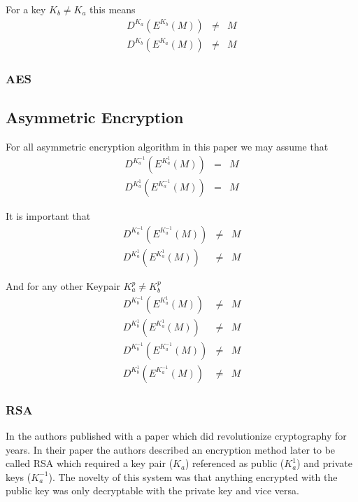 For a key $K_b\neq K_a$ this means
\begin{eqnarray}
	D^{K_a}\left(E^{K_b}\left(M\right)\right) & \neq & M\\
	D^{K_b}\left(E^{K_a}\left(M\right)\right) & \neq & M
\end{eqnarray} 

\subsubsection{AES}

\subsection{Asymmetric Encryption}
For all asymmetric encryption algorithm in this paper we may assume that 
\begin{eqnarray}
	D^{K^{-1}_a}\left(E^{K^{1}_a}\left(M\right)\right) & = & M\\
	D^{K^{1}_a}\left(E^{K^{-1}_a}\left(M\right)\right) & = & M
\end{eqnarray} 

It is important that 
\begin{eqnarray}
	D^{K^{-1}_a}\left(E^{K^{-1}_a}\left(M\right)\right) & \neq & M\\
	D^{K^{1}_a}\left(E^{K^{1}_a}\left(M\right)\right) & \neq & M
\end{eqnarray} 

And for any other Keypair $K^{p}_a \neq K^{p}_b$
\begin{eqnarray}
	D^{K^{-1}_b}\left(E^{K^{1}_a}\left(M\right)\right) & \neq & M\\
	D^{K^{1}_b}\left(E^{K^{1}_a}\left(M\right)\right) & \neq & M\\
	D^{K^{-1}_b}\left(E^{K^{-1}_a}\left(M\right)\right) & \neq & M\\
	D^{K^{1}_b}\left(E^{K^{-1}_a}\left(M\right)\right) & \neq & M
\end{eqnarray} 

\subsubsection{RSA}
In \citeyear{Rivest:1978:MOD:359340.359342} the authors \citeauthor{Rivest:1978:MOD:359340.359342} published with \cite{Rivest:1978:MOD:359340.359342} a paper which did revolutionize cryptography for years. In their paper the authors described an encryption method later to be called RSA which required a key pair ($K_a$) referenced as public ($K^{1}_a$) and private keys ($K^{-1}_a$). The novelty of this system was that anything encrypted with the public key was only decryptable with the private key and vice versa.

